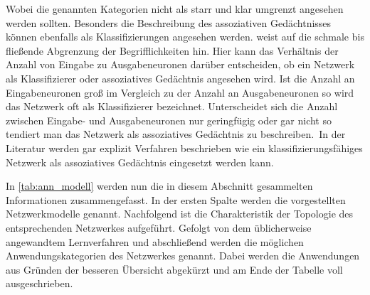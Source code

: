 Wobei die genannten Kategorien nicht als starr und klar umgrenzt angesehen werden sollten. Besonders die Beschreibung des assoziativen Gedächtnisses können ebenfalls als Klassifizierungen angesehen werden. \citet{Gurney1997} weist auf die schmale bis fließende Abgrenzung der Begrifflichkeiten hin. Hier kann das Verhältnis der Anzahl von Eingabe zu Ausgabeneuronen darüber entscheiden, ob ein Netzwerk als Klassifizierer oder assoziatives Gedächtnis angesehen wird. Ist die Anzahl an Eingabeneuronen groß im Vergleich zu der Anzahl an Ausgabeneuronen so wird das Netzwerk oft als Klassifizierer bezeichnet. Unterscheidet sich die Anzahl zwischen Eingabe- und Ausgabeneuronen nur geringfügig oder gar nicht so tendiert man das Netzwerk als assoziatives Gedächtnis zu beschreiben.\, In der Literatur werden gar explizit Verfahren beschrieben wie ein klassifizierungsfähiges Netzwerk als assoziatives Gedächtnis eingesetzt werden kann.\,

In \autoref{tab:ann_modell} werden nun die in diesem Abschnitt gesammelten Informationen zusammengefasst. In der ersten Spalte werden die vorgestellten Netzwerkmodelle genannt. Nachfolgend ist die Charakteristik der Topologie des entsprechenden Netzwerkes aufgeführt. Gefolgt von dem üblicherweise angewandtem Lernverfahren und abschließend werden die möglichen Anwendungskategorien des Netzwerkes genannt. Dabei werden die Anwendungen aus Gründen der besseren Übersicht abgekürzt und am Ende der Tabelle voll ausgeschrieben.


